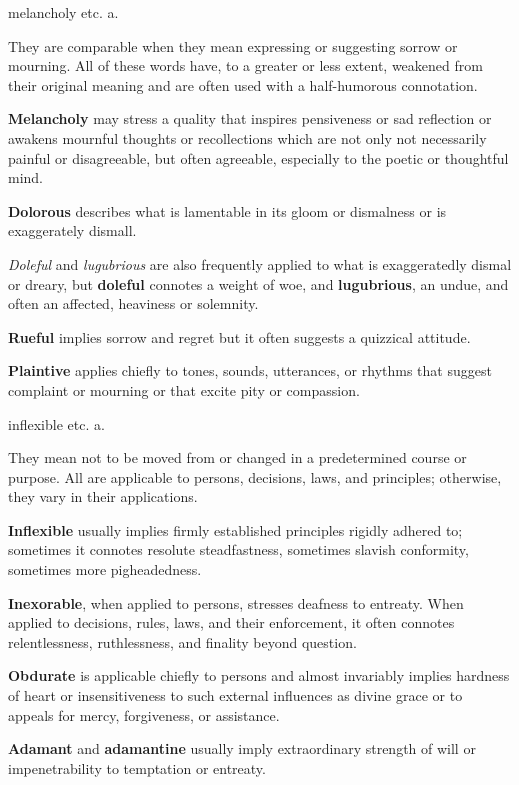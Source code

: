 \begin{description}[style=unboxed]
{melancholy etc.} a.
\begin{mynewitemize}
\item They are comparable when they mean expressing or suggesting sorrow
or mourning. All of these words have, to a greater or less extent, weakened
from their original meaning and are often used with a half-humorous
connotation.
\item \textbf{Melancholy} may stress a quality that inspires pensiveness
or sad reflection or awakens mournful thoughts or recollections which are
not only not necessarily painful or disagreeable, but often agreeable, 
especially to the poetic or thoughtful mind.
\item \textbf{Dolorous} describes what is lamentable in its gloom or
dismalness or is exaggerately dismall.
\item \textit{Doleful} and \textit{lugubrious} are also frequently 
applied to what is exaggeratedly dismal or dreary, but \textbf{doleful}
connotes a weight of woe, and \textbf{lugubrious}, an undue, and often
an affected, heaviness or solemnity.
\item \textbf{Rueful} implies sorrow and regret but it often suggests a
quizzical attitude.
\item \textbf{Plaintive} applies chiefly to tones, sounds, utterances, or 
rhythms that suggest complaint or mourning or that excite pity or compassion.
\end{mynewitemize}

{inflexible etc.} a.
\begin{mynewitemize}
\item They mean not to be moved from or changed in a predetermined course
or purpose. All are applicable to persons, decisions, laws, and principles;
otherwise, they vary in their applications.
\item \textbf{Inflexible} usually implies firmly established principles
rigidly adhered to; sometimes it connotes resolute steadfastness, sometimes 
slavish conformity, sometimes more pigheadedness.
\item \textbf{Inexorable}, when applied to persons, stresses deafness to 
entreaty. When applied to decisions, rules, laws, and their enforcement,
it often connotes relentlessness, ruthlessness, and finality beyond
question.
\item \textbf{Obdurate} is applicable chiefly to persons and almost 
invariably implies hardness of heart or insensitiveness to such external
influences as divine grace or to appeals for mercy, forgiveness, or
assistance.
\item \textbf{Adamant} and \textbf{adamantine} usually imply extraordinary
strength of will or impenetrability to temptation or entreaty.
\end{mynewitemize}


\end{description}
